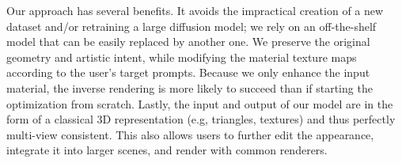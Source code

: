 Our approach has several benefits.
It avoids the impractical creation of a new dataset and/or retraining a large diffusion model; we rely on an off-the-shelf model that can be easily replaced by another one.
We preserve the original geometry and artistic intent, while modifying the material texture maps according to the user's target prompts. 
Because we only enhance the input material, the inverse rendering is more likely to succeed than if starting the optimization from scratch.
Lastly, the input and output of our model are in the form of a classical 3D representation (e.g, triangles, textures) and thus perfectly multi-view consistent. This also allows users to further edit the appearance, integrate it into larger scenes, and render with common renderers.







 







